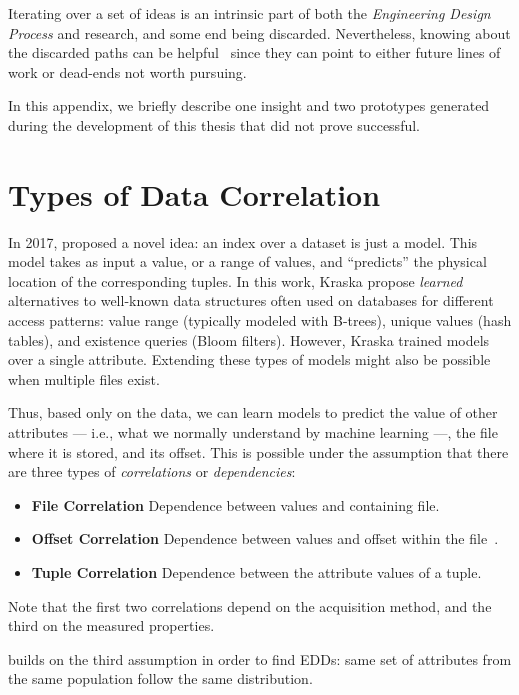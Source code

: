 Iterating over a set of ideas is an intrinsic part of both the
\emph{Engineering Design Process} and research, and some end being discarded.
Nevertheless, knowing about the discarded paths can be helpful~\cite{conroy_three_2020}
since they can point to either future lines of work or dead-ends not worth pursuing.

In this appendix, we briefly describe one insight and two prototypes generated during
the development of this thesis that did not prove successful.

\section{Types of Data Correlation}

In 2017, \cite{Kraska2017} proposed a novel idea: an index over a dataset
is just a model. This model takes as input a value, or a range of values,
and ``predicts'' the physical location of the corresponding tuples.
In this work, Kraska \etal propose \emph{learned} alternatives to well-known data
structures often used on databases for different access patterns:
value range (typically modeled with B-trees), unique values (hash tables),
and existence queries (Bloom filters).
However, Kraska \etal trained models over a single attribute.
Extending these types of models might also be possible when multiple files exist.

Thus, based only on the data, we can learn models to predict the value of
other attributes --- i.e., what we normally understand by machine learning ---,
the file where it is stored, and its offset.
This is possible under the assumption that there are three types of \emph{correlations}
or \emph{dependencies}:

\begin{itemize}
    \item \textbf{File Correlation} Dependence between values and containing file.
    \item \textbf{Offset Correlation} Dependence between values and offset within the
        file~\cite{Kraska2017}.
    \item \textbf{Tuple Correlation} Dependence between the attribute values of a tuple.
\end{itemize}

Note that the first two correlations depend on the acquisition method, and the third
on the measured properties.

\PresQ builds on the third assumption in order to find \glspl{EDD}: same set of attributes
from the same population follow the same distribution.

